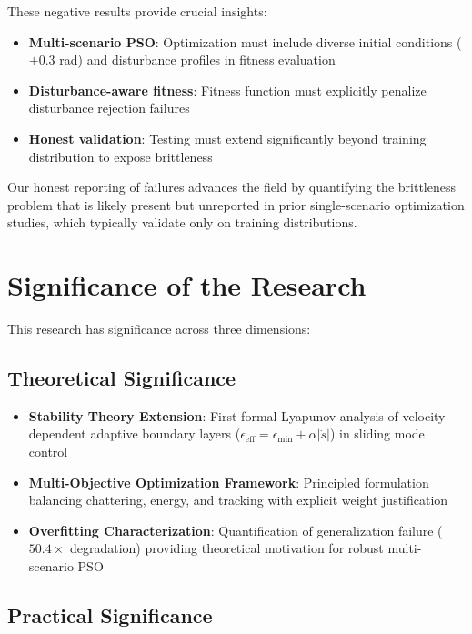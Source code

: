 These negative results provide crucial insights:
\begin{itemize}
    \item \textbf{Multi-scenario PSO}: Optimization must include diverse initial conditions ($\pm0.3$ rad) and disturbance profiles in fitness evaluation
    \item \textbf{Disturbance-aware fitness}: Fitness function must explicitly penalize disturbance rejection failures
    \item \textbf{Honest validation}: Testing must extend significantly beyond training distribution to expose brittleness
\end{itemize}

Our honest reporting of failures advances the field by quantifying the brittleness problem that is likely present but unreported in prior single-scenario optimization studies, which typically validate only on training distributions.

\section{Significance of the Research}
\label{sec:significance}

This research has significance across three dimensions:

\subsection{Theoretical Significance}

\begin{itemize}
    \item \textbf{Stability Theory Extension}: First formal Lyapunov analysis of velocity-dependent adaptive boundary layers ($\epsilon_{\text{eff}} = \epsilon_{\min} + \alpha|\dot{s}|$) in sliding mode control

    \item \textbf{Multi-Objective Optimization Framework}: Principled formulation balancing chattering, energy, and tracking with explicit weight justification

    \item \textbf{Overfitting Characterization}: Quantification of generalization failure ($50.4\times$ degradation) providing theoretical motivation for robust multi-scenario PSO
\end{itemize}

\subsection{Practical Significance}


